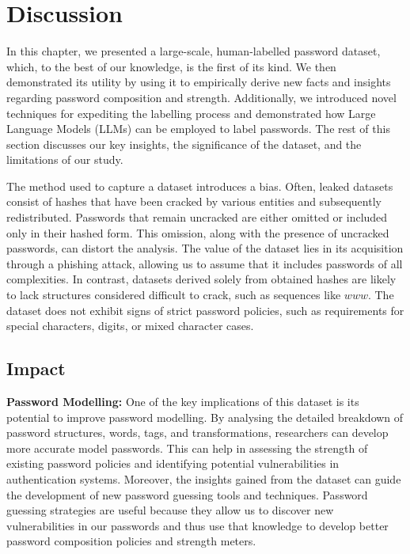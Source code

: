 \section{Discussion}
\label{sec::passwordninja::discussion}

In this chapter, we presented a large-scale, human-labelled password dataset, which, to the best of our knowledge, is the first of its kind. We then demonstrated its utility by using it to empirically derive new facts and insights regarding password composition and strength. Additionally, we introduced novel techniques for expediting the labelling process and demonstrated how Large Language Models (LLMs) can be employed to label passwords. The rest of this section discusses our key insights, the significance of the dataset, and the limitations of our study.

The method used to capture a dataset introduces a bias. Often, leaked datasets consist of hashes that have been cracked by various entities and subsequently redistributed. Passwords that remain uncracked are either omitted or included only in their hashed form. This omission, along with the presence of uncracked passwords, can distort the analysis. The value of the \hmail dataset lies in its acquisition through a phishing attack, allowing us to assume that it includes passwords of all complexities. In contrast, datasets derived solely from obtained hashes are likely to lack structures considered difficult to crack, such as sequences like $www$. The \hmail dataset does not exhibit signs of strict password policies, such as requirements for special characters, digits, or mixed character cases.

\subsection{Impact}
\label{sec::passwordninja::impact}

\textbf{Password Modelling:} One of the key implications of this dataset is its potential to improve password modelling. By analysing the detailed breakdown of password structures, words, tags, and transformations, researchers can develop more accurate model passwords. This can help in assessing the strength of existing password policies and identifying potential vulnerabilities in authentication systems. Moreover, the insights gained from the dataset can guide the development of new password guessing tools and techniques. Password guessing strategies are useful because they allow us to discover new vulnerabilities in our passwords and thus use that knowledge to develop better password composition policies and strength meters.

